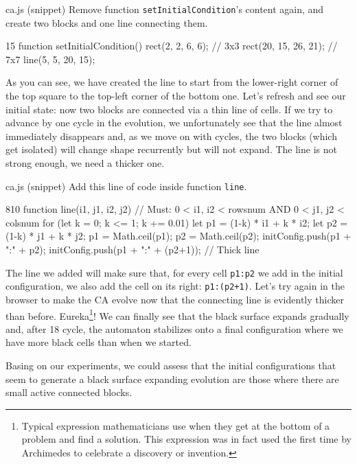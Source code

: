 \begin{programcode}{ca.js (snippet)}
Remove function \texttt{setInitialCondition}'s content again, and create two blocks and one
line connecting them.
\begin{codeh1}{1}{5}
function setInitialCondition() {
  rect(2, 2, 6, 6); // 3x3
  rect(20, 15, 26, 21); // 7x7
  line(5, 5, 20, 15);
}
\end{codeh1}
\end{programcode}

As you can see, we have created the line to start from the lower-right corner of the top square to
the top-left corner of the bottom one. Let's refresh and see our initial state: now two blocks
are connected via a thin line of cells. If we try to advance by one cycle in the evolution, we
unfortunately see that the line almost immediately disappears and, as we move on with cycles,
the two blocks (which get isolated) will change shape recurrently but will not expand. The line
is not strong enough, we need a thicker one.

\begin{programcode}{ca.js (snippet)}
Add this line of code inside function \texttt{line}.
\begin{codeh1}{8}{10}
function line(i1, j1, i2, j2) {
  // Must: 0 < i1, i2 < rowsnum AND 0 < j1, j2 < colsnum
  for (let k = 0; k <= 1; k += 0.01) {
    let p1 = (1-k) * i1 + k * i2;
    let p2 = (1-k) * j1 + k * j2;
    p1 = Math.ceil(p1);
    p2 = Math.ceil(p2);
    initConfig.push(p1 + ":" + p2);
    initConfig.push(p1 + ":" + (p2+1)); // Thick line
  }
}
\end{codeh1}
\end{programcode}

The line we added will make sure that, for every cell \texttt{p1:p2}
we add in the initial configuration, we also add
the cell on its right: \texttt{p1:(p2+1)}. Let's try again in the browser to make the CA evolve
now that the connecting line is evidently thicker than before.
Eureka\footnote{Typical expression mathematicians use when they get at the bottom of
a problem and find a solution. This expression was in fact used the first time by Archimedes
to celebrate a discovery or invention.}! We can finally see that the black surface expands
gradually and, after 18 cycle, the automaton stabilizes onto a final configuration where we have
more black cells than when we started.

\begin{proposition}
\label{prop:expinitconfig}
Basing on our experiments, we could assess that the initial configurations that seem to generate
a black surface expanding evolution are those where there are small active connected blocks.
\end{proposition}

